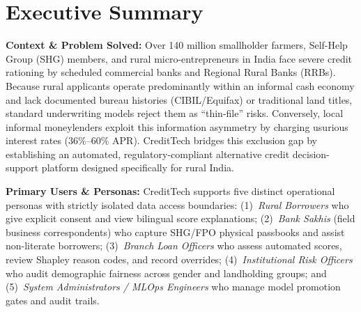 \chapter*{Executive Summary}

\noindent\textbf{Context \& Problem Solved:} Over 140 million smallholder farmers, Self-Help Group (SHG) members, and rural micro-entrepreneurs in India face severe credit rationing by scheduled commercial banks and Regional Rural Banks (RRBs). Because rural applicants operate predominantly within an informal cash economy and lack documented bureau histories (CIBIL/Equifax) or traditional land titles, standard underwriting models reject them as ``thin-file'' risks. Conversely, local informal moneylenders exploit this information asymmetry by charging usurious interest rates ($36\%\text{--}60\%$ APR). CreditTech bridges this exclusion gap by establishing an automated, regulatory-compliant alternative credit decision-support platform designed specifically for rural India.

\vspace{0.3cm}
\noindent\textbf{Primary Users \& Personas:} CreditTech supports five distinct operational personas with strictly isolated data access boundaries: (1)~\textit{Rural Borrowers} who give explicit consent and view bilingual score explanations; (2)~\textit{Bank Sakhis} (field business correspondents) who capture SHG/FPO physical passbooks and assist non-literate borrowers; (3)~\textit{Branch Loan Officers} who assess automated scores, review Shapley reason codes, and record overrides; (4)~\textit{Institutional Risk Officers} who audit demographic fairness across gender and landholding groups; and (5)~\textit{System Administrators / MLOps Engineers} who manage model promotion gates and audit trails.

